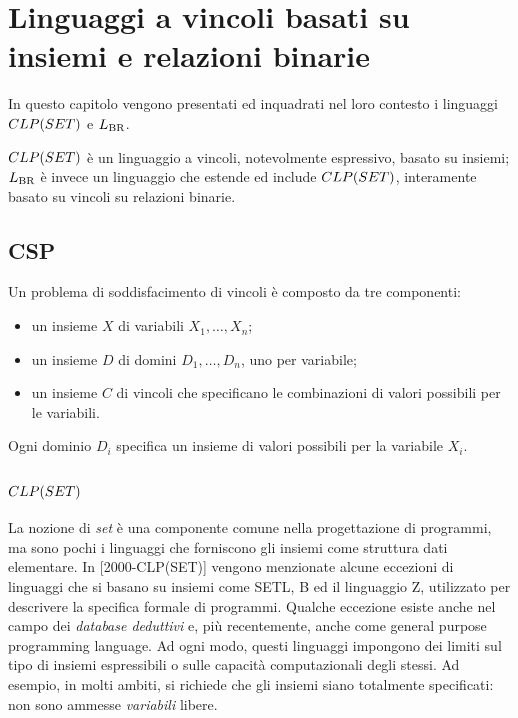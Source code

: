 


\chapter{Linguaggi a vincoli basati su insiemi e relazioni binarie}

In questo capitolo vengono presentati ed inquadrati nel loro contesto i linguaggi $CLP(SET)$ e $L_\mathrm{BR}$.

$CLP(SET)$ è un linguaggio a vincoli, notevolmente espressivo, basato su insiemi; $L_\mathrm{BR}$ è invece un linguaggio che estende ed include $CLP(SET)$, interamente basato su vincoli su relazioni binarie.





\section{CSP}
Un problema di soddisfacimento di vincoli è composto da tre componenti:
\begin{itemize}
\item un insieme $X$ di variabili ${X_1, \ldots, X_n}$;
\item un insieme $D$ di domini ${D_1, \ldots, D_n}$, uno per variabile;
\item un insieme $C$ di vincoli che specificano le combinazioni di valori possibili per le variabili.
\end{itemize}

Ogni dominio $D_i$ specifica un insieme di valori possibili per la variabile $X_i$.


\section{$CLP(SET)$}
La nozione di \emph{set} è una componente comune nella progettazione di programmi, ma sono pochi i linguaggi che forniscono gli insiemi come struttura dati elementare.
In [2000-CLP(SET)] vengono menzionate alcune eccezioni di linguaggi che si basano su insiemi come SETL, B ed il linguaggio Z, utilizzato per descrivere la specifica formale di programmi. Qualche eccezione esiste anche nel campo dei \emph{database deduttivi} e, più recentemente, anche come general purpose programming language. Ad ogni modo, questi linguaggi impongono dei limiti sul tipo di insiemi espressibili o sulle capacità computazionali degli stessi. Ad esempio, in molti ambiti, si richiede che gli insiemi siano totalmente specificati: non sono ammesse \emph{variabili} libere.


